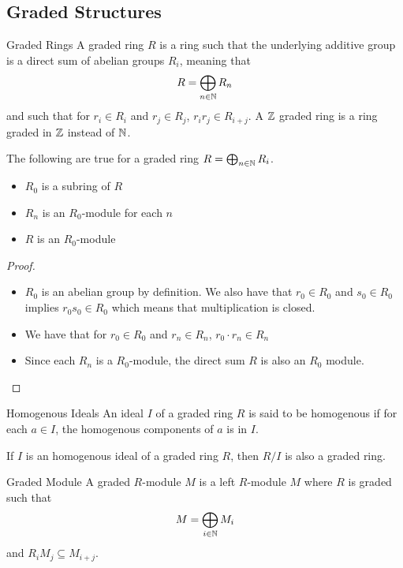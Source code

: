 \documentclass[a4paper]{article}
\begin{document}
\subsection{Graded Structures}
\begin{defn}{Graded Rings}{} A graded ring $R$ is a ring such that the underlying additive group is a direct sum of abelian groups $R_i$, meaning that $$R=\bigoplus_{n\in\mathbb{N}}R_n$$ and such that for $r_i\in R_i$ and $r_j\in R_j$, $r_ir_j\in R_{i+j}$. A $\mathbb{Z}$ graded ring is a ring graded in $\mathbb{Z}$ instead of $\mathbb{N}$. 
\end{defn}

\begin{prp}{}{} The following are true for a graded ring $R=\bigoplus_{n\in\mathbb{N}}R_i$. 
\begin{itemize}
\item $R_0$ is a subring of $R$
\item $R_n$ is an $R_0$-module for each $n$
\item $R$ is an $R_0$-module
\end{itemize} \tcbline
\begin{proof}~\\
\begin{itemize}
\item $R_0$ is an abelian group by definition. We also have that $r_0\in R_0$ and $s_0\in R_0$ implies $r_0s_0\in R_0$ which means that multiplication is closed. 
\item We have that for $r_0\in R_0$ and $r_n\in R_n$, $r_0\cdot r_n\in R_n$
\item Since each $R_n$ is a $R_0$-module, the direct sum $R$ is also an $R_0$ module. 
\end{itemize}
\end{proof}
\end{prp}

\begin{defn}{Homogenous Ideals}{} An ideal $I$ of a graded ring $R$ is said to be homogenous if for each $a\in I$, the homogenous components of $a$ is in $I$. 
\end{defn}

\begin{prp}{}{} If $I$ is an homogenous ideal of a graded ring $R$, then $R/I$ is also a graded ring. 
\end{prp}

\begin{defn}{Graded Module}{} A graded $R$-module $M$ is a left $R$-module $M$ where $R$ is graded such that $$M=\bigoplus_{i\in\mathbb{N}}M_i$$ and $R_iM_j\subseteq M_{i+j}$. 
\end{defn}
\end{document}
